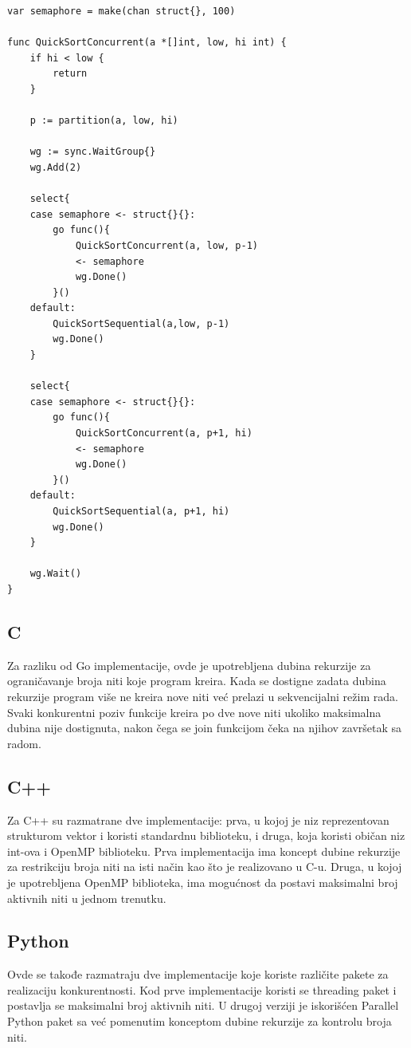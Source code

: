 \documentclass[12pt,oneside]{memoir}
\begin{document}
\begin{center}
\begin{lstlisting}[caption=Go implementacija konkurentne quicksort funkcije,label={lst:qs},float,  backgroundcolor=\color{background}]
var semaphore = make(chan struct{}, 100)

func QuickSortConcurrent(a *[]int, low, hi int) {
	if hi < low {
		return
	}

	p := partition(a, low, hi)

	wg := sync.WaitGroup{}
	wg.Add(2)

	select{
	case semaphore <- struct{}{}:
		go func(){
			QuickSortConcurrent(a, low, p-1)
			<- semaphore
			wg.Done()
		}()
	default:
		QuickSortSequential(a,low, p-1)
		wg.Done()
	}

	select{
	case semaphore <- struct{}{}:
		go func(){
			QuickSortConcurrent(a, p+1, hi)
			<- semaphore
			wg.Done()
		}()
	default:
		QuickSortSequential(a, p+1, hi)
		wg.Done()
	}

	wg.Wait()
}
\end{lstlisting}
\end{center}

\subsection{C}
Za razliku od Go implementacije, ovde je upotrebljena dubina rekurzije za ograničavanje broja niti koje program kreira. Kada se dostigne zadata dubina rekurzije program više ne kreira nove niti već prelazi u sekvencijalni režim rada. Svaki konkurentni poziv funkcije kreira po dve nove niti ukoliko maksimalna dubina nije dostignuta, nakon čega se join funkcijom čeka na njihov završetak sa radom.

\subsection{C++}
Za C++ su razmatrane dve implementacije: prva, u kojoj je niz reprezentovan strukturom vektor i koristi standardnu biblioteku, i druga, koja koristi običan niz int-ova i OpenMP biblioteku. 
Prva implementacija ima koncept dubine rekurzije za restrikciju broja niti na isti način kao što je realizovano u C-u. Druga, u kojoj je upotrebljena OpenMP biblioteka, ima mogućnost da postavi maksimalni broj aktivnih niti u jednom trenutku.

\subsection{Python}
Ovde se takođe razmatraju dve implementacije koje koriste različite pakete za realizaciju konkurentnosti. Kod prve implementacije koristi se threading paket i postavlja se maksimalni broj aktivnih niti. U drugoj verziji je iskorišćen Parallel Python paket sa već pomenutim konceptom dubine rekurzije za kontrolu broja niti. 
\end{document}
